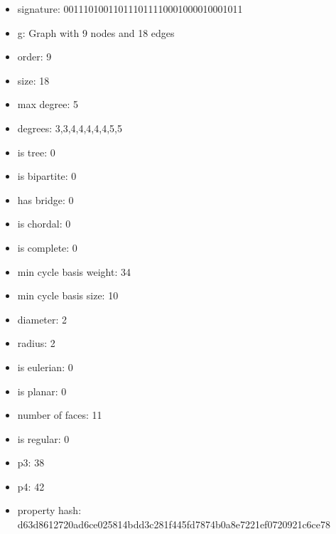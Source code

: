 \newpage
\begin{figure}
\end{figure}
\begin{itemize}
\item signature: 001110100110111011110001000010001011
\item g: Graph with 9 nodes and 18 edges
\item order: 9
\item size: 18
\item max degree: 5
\item degrees: 3,3,4,4,4,4,4,5,5
\item is tree: 0
\item is bipartite: 0
\item has bridge: 0
\item is chordal: 0
\item is complete: 0
\item min cycle basis weight: 34
\item min cycle basis size: 10
\item diameter: 2
\item radius: 2
\item is eulerian: 0
\item is planar: 0
\item number of faces: 11
\item is regular: 0
\item p3: 38
\item p4: 42
\item property hash: d63d8612720ad6ce025814bdd3c281f445fd7874b0a8e7221ef0720921c6ce78
\end{itemize}
